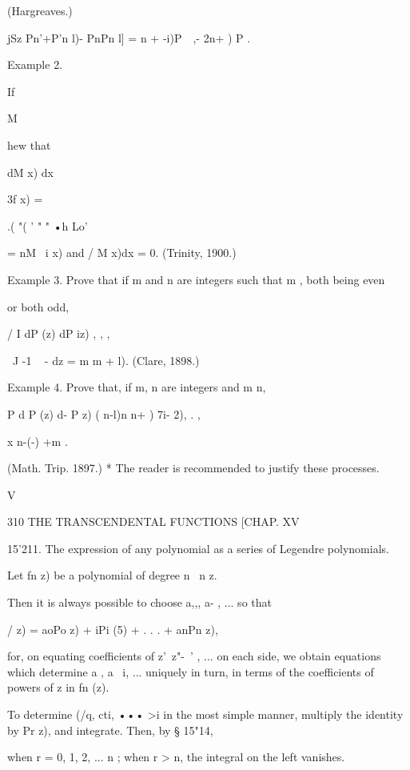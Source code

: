 {(Hargreaves.)



jSz Pn'+P'n l)- PnPn l] = n + -i)P\ \ ,- 2n+ ) P .



Example 2.


If


M


hew that




dM x) dx



3f x) =



.( "( ' " " •h Lo'



= nM \ i x) and / M x)dx = 0. (Trinity, 1900.)



Example 3. Prove that if m and n are integers such that m , both being
even

or both odd,

/ I dP (z) dP iz) , , ,

\ J -1 ~ - dz = m m + l). (Clare, 1898.)

Example 4. Prove that, if m, n are integers and m n,

P d P (z) d- P z) ( n-l)n n+ ) 7i- 2), . ,

x n-(-) +m .

(Math. Trip. 1897.) * The reader is recommended to justify these
processes.



V



310 THE TRANSCENDENTAL FUNCTIONS [CHAP. XV

15'211. The expression of any polynomial as a series of Legendre
polynomials.

Let fn z) be a polynomial of degree n \ n z.

Then it is always possible to choose a,,, a- , ... so that

/ z) = aoPo z) + iPi (5) + . . . + anPn z),

for, on equating coefficients of z'\ z"-~' , ... on each side, we
obtain equations which determine a , a \ i, ... uniquely in turn, in
terms of the coefficients of powers of z in fn (z).

To determine (/q, cti, ••• >i in the most simple manner, multiply the
identity by Pr z), and integrate. Then, by § 15"14,

when r = 0, 1, 2, ... n ; when r > n, the integral on the left
vanishes.

}

